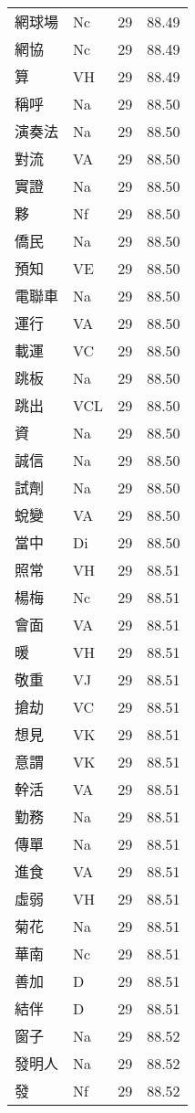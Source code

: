 \documentclass[twocolumn]{book}
\begin{document}
\begin{supertabular}{llrr}
網球場 & Nc & 29 &  88.49\\
網協 & Nc & 29 &  88.49\\
算 & VH & 29 &  88.49\\
稱呼 & Na & 29 &  88.50\\
演奏法 & Na & 29 &  88.50\\
對流 & VA & 29 &  88.50\\
實證 & Na & 29 &  88.50\\
夥 & Nf & 29 &  88.50\\
僑民 & Na & 29 &  88.50\\
預知 & VE & 29 &  88.50\\
電聯車 & Na & 29 &  88.50\\
運行 & VA & 29 &  88.50\\
載運 & VC & 29 &  88.50\\
跳板 & Na & 29 &  88.50\\
跳出 & VCL & 29 &  88.50\\
資 & Na & 29 &  88.50\\
誠信 & Na & 29 &  88.50\\
試劑 & Na & 29 &  88.50\\
蛻變 & VA & 29 &  88.50\\
當中 & Di & 29 &  88.50\\
照常 & VH & 29 &  88.51\\
楊梅 & Nc & 29 &  88.51\\
會面 & VA & 29 &  88.51\\
暖 & VH & 29 &  88.51\\
敬重 & VJ & 29 &  88.51\\
搶劫 & VC & 29 &  88.51\\
想見 & VK & 29 &  88.51\\
意謂 & VK & 29 &  88.51\\
幹活 & VA & 29 &  88.51\\
勤務 & Na & 29 &  88.51\\
傳單 & Na & 29 &  88.51\\
進食 & VA & 29 &  88.51\\
虛弱 & VH & 29 &  88.51\\
菊花 & Na & 29 &  88.51\\
華南 & Nc & 29 &  88.51\\
善加 & D & 29 &  88.51\\
結伴 & D & 29 &  88.51\\
窗子 & Na & 29 &  88.52\\
發明人 & Na & 29 &  88.52\\
發 & Nf & 29 &  88.52\\

\end{supertabular}
\end{document}
